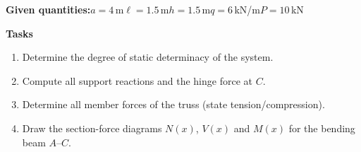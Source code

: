 \documentclass[a4paper,11pt]{article}
\begin{document}
\textbf{Given quantities:}\quad $a = 4$\,m\quad $\ell = 1.5$\,m\quad $h = 1.5$\,m\quad $q = 6$\,kN/m\quad $P = 10$\,kN
\par\medskip
\textbf{Tasks}\par
\begin{enumerate}[label=\textbf{\arabic*.}]
  \item Determine the degree of static determinacy of the system.
  \item Compute all support reactions and the hinge force at $C$.
  \item Determine all member forces of the truss (state tension/compression).
  \item Draw the section-force diagrams $N(x)$, $V(x)$ and $M(x)$ for the bending beam $A$--$C$.
\end{enumerate}
\end{document}
